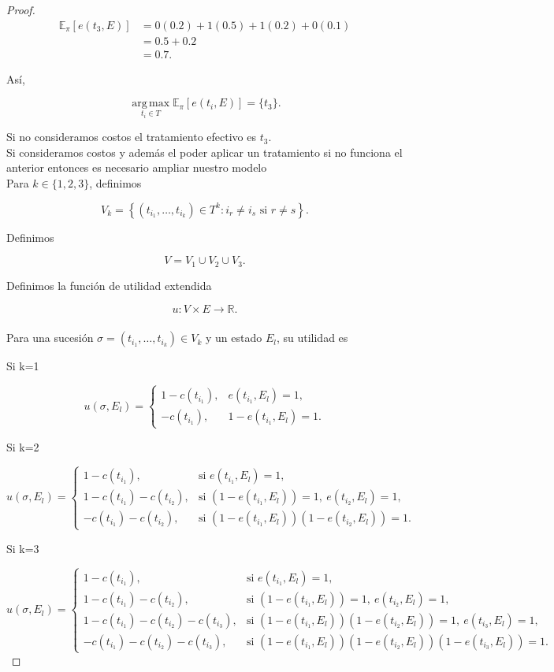 \documentclass[11pt,letterpaper]{article}
\begin{document}
\begin{proof}
    \[
    \begin{aligned}
    \mathbb{E}_\pi[e(t_3,E)] &=0(0.2)+1(0.5)+1(0.2)+0(0.1)\\ &=0.5+0.2\\ &=0.7.
    \end{aligned}
    \]
    
    Así,

    \[
    \operatorname*{arg\,max}_{t_i\in T}\mathbb{E}_\pi[e(t_i,E)]=\{t_3\}.
    \]

    Si no consideramos costos el tratamiento efectivo es $t_3$.\\



   Si consideramos costos y además el poder aplicar un tratamiento si no funciona el anterior entonces es necesario ampliar nuestro modelo \\

    Para \(k\in\{1,2,3\}\), definimos

    \[
    V_k=\left\{(t_{i_1},\ldots,t_{i_k})\in T^k:i_r\neq i_s\text{ si }r\neq s\right\}.
    \]

    Definimos

    \[
    V=V_1\cup V_2\cup V_3.
    \]

    Definimos la función de utilidad extendida
    
    \[
    u:V\times E\xrightarrow[]{}\mathbb{R}.
    \]

    Para una sucesión \(\sigma=(t_{i_1},\ldots,t_{i_k})\in V_k\) y un estado \(E_l\), su utilidad es

    Si k=1

    \[
    u(\sigma,E_l)=
    \begin{cases}
    1-c(t_{i_1}), & e(t_{i_1},E_l)=1,\\
    -c(t_{i_1}), & 1-e(t_{i_1},E_l)=1.
    \end{cases}
    \]

    Si k=2

    \[
    u(\sigma,E_l)=
    \begin{cases}
    1-c(t_{i_1}),
    & \text{si }e(t_{i_1},E_l)=1,\\
    1-c(t_{i_1})-c(t_{i_2}),
    & \text{si }(1-e(t_{i_1},E_l))=1,\ e(t_{i_2},E_l)=1,\\
    -c(t_{i_1})-c(t_{i_2}),
    & \text{si }(1-e(t_{i_1},E_l))(1-e(t_{i_2},E_l))=1.
    \end{cases}
    \]

    Si k=3

    \[
    u(\sigma,E_l)=
    \begin{cases}
    1-c(t_{i_1}),
    & \text{si }e(t_{i_1},E_l)=1,\\
    1-c(t_{i_1})-c(t_{i_2}),
    & \text{si }(1-e(t_{i_1},E_l))=1,\ e(t_{i_2},E_l)=1,\\
    1-c(t_{i_1})-c(t_{i_2})-c(t_{i_3}),
    & \text{si }(1-e(t_{i_1},E_l))(1-e(t_{i_2},E_l))=1,\ e(t_{i_3},E_l)=1,\\
    -c(t_{i_1})-c(t_{i_2})-c(t_{i_3}),
    & \text{si }(1-e(t_{i_1},E_l))(1-e(t_{i_2},E_l))(1-e(t_{i_3},E_l))=1.
    \end{cases}
    \]


\end{proof}
\end{document}
